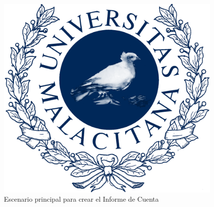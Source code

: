 \newpage %

\begin{figure}[H]
    \includegraphics[width=1\linewidth]{assets/umaLogo.png}
    \caption{Escenario principal para crear el Informe de Cuenta}
   \end{figure}
\vspace{1.0cm}

\newpage %